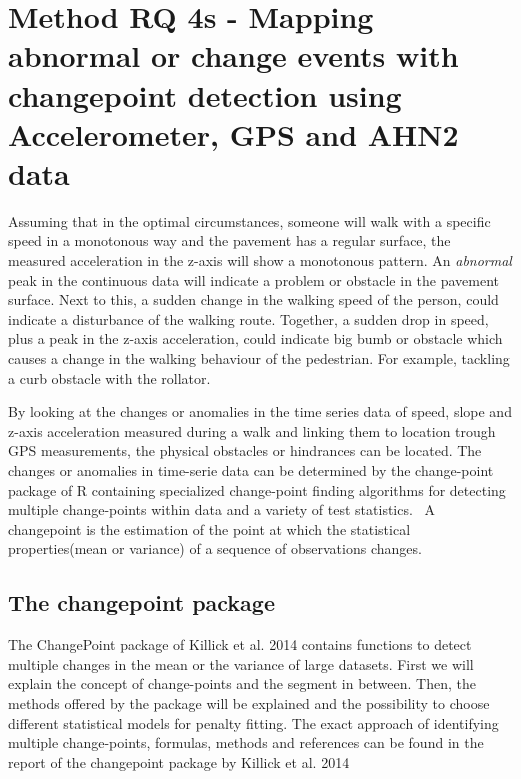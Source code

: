 \section{Method RQ 4s - Mapping abnormal or change events with changepoint detection using Accelerometer, GPS and AHN2 data}\label{rq2c}

Assuming that in the optimal circumstances, someone will walk with a specific speed in a monotonous way and the pavement has a regular surface, the measured acceleration in the z-axis will show a monotonous pattern. An \emph{abnormal} peak in the continuous data will indicate a problem or obstacle in the pavement surface. Next to this, a sudden change in the walking speed of the person, could indicate a disturbance of the walking route. Together, a sudden drop in speed, plus a peak in the z-axis acceleration, could indicate big bumb or obstacle which causes a change in the walking behaviour of the pedestrian. For example, tackling a curb obstacle with the rollator. 

By looking at the changes or anomalies in the time series data of speed, slope and z-axis acceleration measured during a walk and linking them to location trough GPS measurements, the physical obstacles or hindrances can be located. The changes or anomalies in time-serie data can be determined by the change-point package of R containing specialized change-point finding algorithms for detecting multiple change-points within data and a variety of test statistics.~\cite{changepoint2015,  killick2014} A changepoint is the estimation of the point at which the statistical properties(mean or variance) of a sequence of observations changes.

\subsection{The changepoint package}
The ChangePoint package of Killick et al. 2014 contains functions to detect multiple changes in the mean or the variance of large datasets. First we will explain the concept of change-points and the segment in between. Then, the methods offered by the package will be explained and the possibility to choose different statistical models for penalty fitting. The exact approach of identifying multiple change-points, formulas, methods and references can be found in the report of the changepoint package by Killick et al. 2014~\cite{killick2014}

